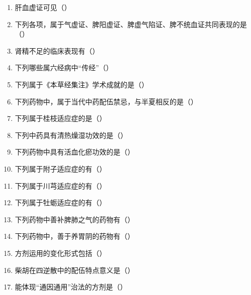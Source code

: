 \documentclass[a4paper,11pt]{ctexart}
\begin{document}
\begin{enumerate}[resume]
      \item 肝血虚证可见（\quad）
      \item 下列各项，属于气虚证、脾阳虚证、脾虚气陷证、脾不统血证共同表现的是（\quad）
      \item 肾精不足的临床表现有（\quad）
      \item 下列哪些属六经病中“传经”（\quad）
      \item 下列属于《本草经集注》学术成就的是（\quad）
      \item 下列药物中，属于当代中药配伍禁忌，与半夏相反的是（\quad）
      \item 下列属于桂枝适应症的是（\quad）
      \item 下列中药具有清热燥湿功效的是（\quad）
      \item 下列药物中具有活血化瘀功效的是（\quad）
      \item 下列属于附子适应症的有（\quad）
      \item 下列属于川芎适应症的有（\quad）
      \item 下列属于牡蛎适应症的有（\quad）
      \item 下列药物中善补脾肺之气的药物有（\quad）
      \item 下列药物中，善于养胃阴的药物有（\quad）
      \item 方剂运用的变化形式包括（\quad）
      \item 柴胡在四逆散中的配伍特点意义是（\quad）
      \item 能体现“通因通用”治法的方剂是（\quad）

\end{enumerate}
\end{document}
